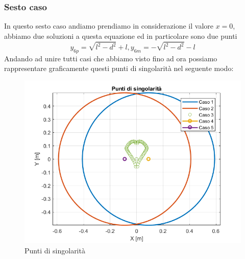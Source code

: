 \subsubsection*{Sesto caso}
In questo sesto caso andiamo prendiamo in considerazione il valore $x=0$, abbiamo due soluzioni a questa equazione ed in particolare sono due punti
\begin{equation}
    y_{6p} = \sqrt{l^2-d^2}+l , y_{6m} = -\sqrt{l^2-d^2}-l
\end{equation}
Andando ad unire tutti casi che abbiamo visto fino ad ora possiamo rappresentare graficamente questi punti di singolarità nel seguente modo:
\begin{figure}[ht]
\begin{center}
    \includegraphics[scale=0.35]{Immagini/Singolarity/SingNew}
    \caption{Punti di singolarità}
\end{center}
\end{figure}
